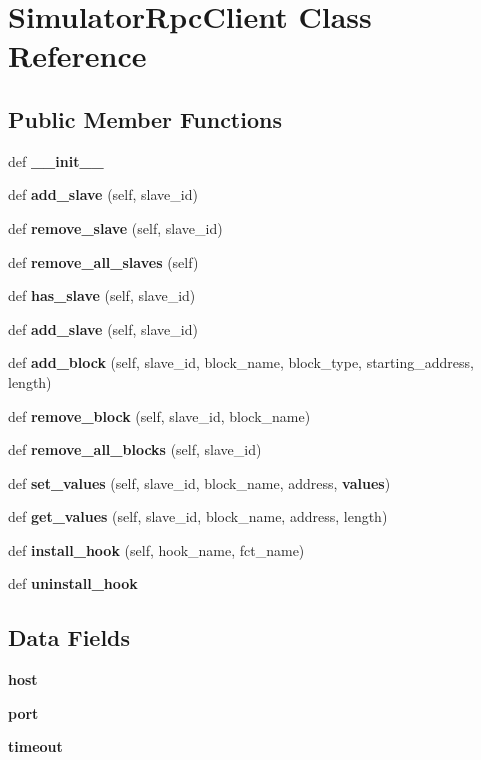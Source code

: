 \section{Simulator\+Rpc\+Client Class Reference}
\label{classprotolibs_1_1modbus__tk_1_1simulator__rpc__client_1_1_simulator_rpc_client}
\subsection*{Public Member Functions}
\begin{DoxyCompactItemize}
\item 
def {\bf \+\_\+\+\_\+init\+\_\+\+\_\+}
\item 
def {\bf add\+\_\+slave} (self, slave\+\_\+id)
\item 
def {\bf remove\+\_\+slave} (self, slave\+\_\+id)
\item 
def {\bf remove\+\_\+all\+\_\+slaves} (self)
\item 
def {\bf has\+\_\+slave} (self, slave\+\_\+id)
\item 
def {\bf add\+\_\+slave} (self, slave\+\_\+id)
\item 
def {\bf add\+\_\+block} (self, slave\+\_\+id, block\+\_\+name, block\+\_\+type, starting\+\_\+address, length)
\item 
def {\bf remove\+\_\+block} (self, slave\+\_\+id, block\+\_\+name)
\item 
def {\bf remove\+\_\+all\+\_\+blocks} (self, slave\+\_\+id)
\item 
def {\bf set\+\_\+values} (self, slave\+\_\+id, block\+\_\+name, address, {\bf values})
\item 
def {\bf get\+\_\+values} (self, slave\+\_\+id, block\+\_\+name, address, length)
\item 
def {\bf install\+\_\+hook} (self, hook\+\_\+name, fct\+\_\+name)
\item 
def {\bf uninstall\+\_\+hook}
\end{DoxyCompactItemize}
\subsection*{Data Fields}
\begin{DoxyCompactItemize}
\item 
{\bf host}
\item 
{\bf port}
\item 
{\bf timeout}
\end{DoxyCompactItemize}


